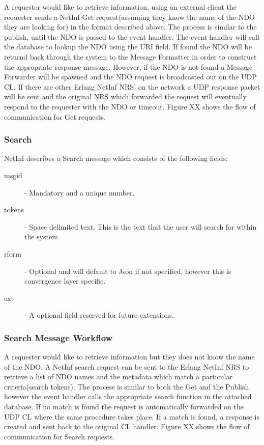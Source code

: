 A requester would like to retrieve information, using an external client the requester sends a NetInf Get request(assuming they know the name of the NDO they are looking for) in the format described above. The process is similar to the publish, until the NDO is passed to the event handler. The event handler will call the database to lookup the NDO using the URI field. If found the NDO will be returnd back through the system to the Message Formatter in order to construct the appropriate response message. However, if the NDO is not found a Message Forwarder will be spawned and the NDO request is broadcasted out on the UDP CL. If there are other Erlang NetInf NRS' on the network a UDP response packet will be sent and the original NRS which forwarded the request will eventually respond to the requester with the NDO or timeout. Figure XX shows the flow of communication for Get requests.

\subsubsection{Search}

NetInf describes a Search message which consists of the following fields:

\begin{description}
\item[msgid] - Mandatory and a unique number.
\item[tokens] - Space delimited text. This is the text that the user will search for within the system
\item[rform] - Optional and will default to Json if not specified, however this is convergence layer specific.
\item[ext] - A optional field reserved for future extensions.
\end{description}

\subsubsection{Search Message Workflow}

A requester would like to retrieve information but they does not know the name of the NDO. A NetInf search request can be sent to the Erlang NetInf NRS to retrieve a list of NDO names and the metadata which match a particular criteria(search tokens). The process is similar to both the Get and the Publish however the event handler calls the appropriate search function in the attached database. If no match is found the request is automatically forwarded on the UDP CL where the same procedure takes place. If a match is found, a response is created  and sent back to the original CL handler. Figure XX shows the flow of communication for  Search requests.
